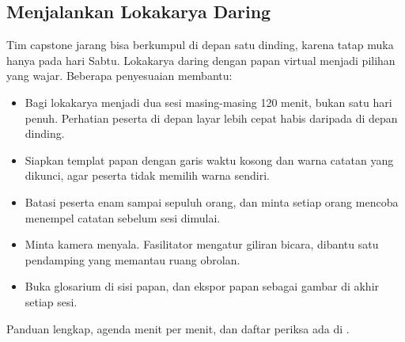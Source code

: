 \subsection{Menjalankan Lokakarya Daring}

Tim capstone jarang bisa berkumpul di depan satu dinding, karena tatap muka hanya pada hari Sabtu.
Lokakarya daring dengan papan virtual menjadi pilihan yang wajar. Beberapa penyesuaian membantu:
\begin{itemize}
  \item Bagi lokakarya menjadi dua sesi masing-masing 120 menit, bukan satu hari penuh. Perhatian
        peserta di depan layar lebih cepat habis daripada di depan dinding.
  \item Siapkan templat papan dengan garis waktu kosong dan warna catatan yang dikunci, agar
        peserta tidak memilih warna sendiri.
  \item Batasi peserta enam sampai sepuluh orang, dan minta setiap orang mencoba menempel catatan
        sebelum sesi dimulai.
  \item Minta kamera menyala. Fasilitator mengatur giliran bicara, dibantu satu pendamping yang
        memantau ruang obrolan.
  \item Buka glosarium di sisi papan, dan ekspor papan sebagai gambar di akhir setiap sesi.
\end{itemize}
Panduan lengkap, agenda menit per menit, dan daftar periksa ada di
.

